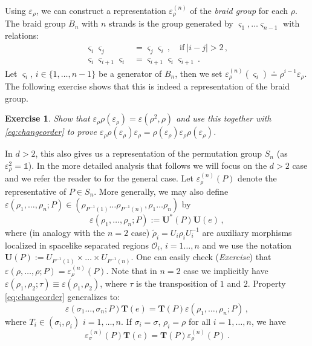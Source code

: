 \documentclass[12pt,a4paper]{article}
\newcommand{\1}{\mathds{1}}                         %
\newcommand{\Ocal}{\mathcal{O}}
\newcommand{\Ac}{{\mathcal{A}}}
\newtheorem{exercise}[theorem]{Exercise}
\begin{document}
Using $\varepsilon_\rho$, we can construct a representation $\varepsilon^{(n)}_\rho$ of the \emph{braid group} for each $\rho$. The braid group $B_n$ with $n$ strands is the group generated by $\varsigma_1,\dots \varsigma_{n-1}$ with relations:
\begin{align*}
\varsigma_i\varsigma_j&=\varsigma_j\varsigma_i\,,\quad \textrm{if}\ |i-j|>2\,,\\
\varsigma_i \varsigma_{i+1} \varsigma_i&=\varsigma_{i+1}\varsigma_i \varsigma_{i+1}\,.
 \end{align*}
Let $\varsigma_i$, $i\in\{1,\dots,n-1\}$ be a generator of  $B_n$, then we set $\varepsilon^{(n)}_\rho(\varsigma_i)\doteq \rho^{i-1}\varepsilon_\rho$. 
The following exercise shows that this is indeed a representation of the braid group.
\begin{exercise}
   Show that $\varepsilon_\rho\rho(\varepsilon_\rho)=\varepsilon(\rho^2,\rho)$ and use this together with \eqref{eq:changeorder} to prove $\varepsilon_\rho\rho(\varepsilon_\rho)\varepsilon_\rho=\rho(\varepsilon_\rho)\varepsilon_\rho\rho(\varepsilon_\rho)$.
\end{exercise}

In $d>2$, this also gives us a representation of the permutation group $S_n$ (as $\varepsilon_\rho^2=\1$). In the more detailed analysis that follows we will focus on the $d>2$ case and we refer the reader to \cite{FRS89} for the general case. Let  $\varepsilon^{(n)}_\rho(P)$ denote the representative of $P\in S_n$. More generally, we may also define $\varepsilon(\rho_1,\dots,\rho_n; P)\in (\rho_{P^{-1}(1)}\dots \rho_{P^{-1}(n)},\rho_1\dots\rho_n)$ by
\[
\varepsilon(\rho_1,\dots,\rho_n;P):=\boldsymbol{U}^*(P)  \boldsymbol{U}(e)\,,
\]
where (in analogy with the $n=2$ case) $\tilde{\rho}_i=U_i\rho_i U_i^{-1}$ are auxiliary morphisms localized in spacelike separated regions $\Ocal_i$, $i=1\dots,n$ and we use the notation $\boldsymbol{U}(P):=U_{P^{-1}(1)}\times\dots \times U_{P^{-1}(n)}$. One can easily check (\textit{Exercise}) that $\varepsilon(\rho,\dots,\rho;P)=\varepsilon^{(n)}_\rho(P)$. Note that in $n=2$ case we implicitly have $\varepsilon(\rho_1,\rho_2;\tau)\equiv \varepsilon(\rho_1,\rho_2)$, where $\tau$ is the transposition of $1$ and $2$.
Property \eqref{eq:changeorder} generalizes to:
\[
\varepsilon(\sigma_1\dots,\sigma_n;P)   \boldsymbol{T}(e)=\boldsymbol{T}(P)  \varepsilon(\rho_1,\dots,\rho_n;P)\,,
\]
where $T_i\in(\sigma_i,\rho_i)$  $i=1,\dots,n$. If $\sigma_i=\sigma$, $\rho_i=\rho$ for all $i=1,\dots,n$, we have
\[
\varepsilon^{(n)}_\sigma(P)   \boldsymbol{T}(e)=\boldsymbol{T}(P)  \varepsilon^{(n)}_\rho(P)\,.
\]
\end{document}
